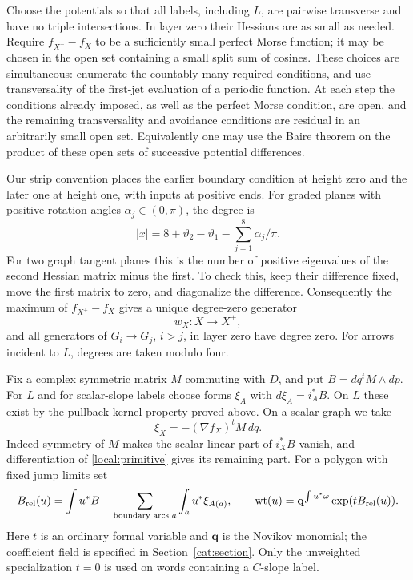 \documentclass[11pt]{article}
\theoremstyle{definition}
\theoremstyle{remark}
\newcommand{\qnov}{\mathbf q}
\numberwithin{equation}{section}
\begin{document}
Choose the potentials so that all labels, including $L$, are pairwise
transverse and have no triple intersections.  In layer zero their Hessians
are as small as needed.  Require $f_{X^+}-f_X$ to be a sufficiently small
perfect Morse function; it may be chosen in the open set containing a small
split sum of cosines.  These choices are simultaneous: enumerate the
countably many required conditions, and use transversality of the
first-jet evaluation of a periodic function.  At each step the conditions
already imposed, as well as the perfect Morse condition, are open, and the
remaining transversality and avoidance conditions are residual in an
arbitrarily small open set.  Equivalently one may use the Baire theorem on
the product of these open sets of successive potential differences.

Our strip convention places the earlier boundary condition at height zero
and the later one at height one, with inputs at positive ends.  For graded
planes with positive rotation angles $\alpha_j\in(0,\pi)$, the degree is
\begin{equation}\label{local:degree}
 |x|=8+\vartheta_2-\vartheta_1-\sum_{j=1}^8\alpha_j/\pi.
\end{equation}
For two graph tangent planes this is the number of positive eigenvalues of
the second Hessian matrix minus the first.  To check this, keep their
difference fixed, move the first matrix to zero, and diagonalize the
difference.  Consequently the maximum of $f_{X^+}-f_X$ gives a unique
degree-zero generator
\[
 w_X\colon X\longrightarrow X^+,
\]
and all generators of $G_i\to G_j$, $i>j$, in layer zero have degree zero.
For arrows incident to $L$, degrees are taken modulo four.

Fix a complex symmetric matrix $M$ commuting with $D$, and put
$B=dq^tM\wedge dp$.  For $L$ and for scalar-slope labels choose forms
$\xi_A$ with $d\xi_A=i_A^*B$.  On $L$ these exist by the pullback-kernel
property proved above.  On a scalar graph we take
\begin{equation}\label{local:primitive}
 \xi_X=-(\nabla f_X)^tM\,dq.
\end{equation}
Indeed symmetry of $M$ makes the scalar linear part of $i_X^*B$ vanish,
and differentiation of \eqref{local:primitive} gives its remaining part.
For a polygon with fixed jump limits set
\begin{equation}\label{local:relative-weight}
 B_{\rm rel}(u)=\int u^*B-\sum_{\text{boundary arcs }a}
                         \int_a u^*\xi_{A(a)},\qquad
 \mathrm{wt}(u)=\qnov^{\int u^*\omega}\exp(tB_{\rm rel}(u)).
\end{equation}
Here $t$ is an ordinary formal variable and $\qnov$ is the Novikov monomial;
the coefficient field is specified in Section~\ref{cat:section}.
Only the unweighted specialization $t=0$ is used on words containing a
$C$-slope label.
\end{document}
